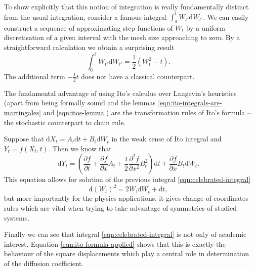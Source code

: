 \documentclass{doctoral}
\newcommand{\pd}{\partial}
\newcommand{\dd}{\mathrm{d}}
\begin{document}
To show explicitly that this notion of integration is really fundamentally distinct from the usual integration, consider a famous integral $\int_0^t W_{t'} \dd W_{t'}$.
We can easily construct a sequence of approximating step functions of $W_{t}$ by a uniform discretisation of a given interval with the mesh size approaching to zero.
By a straightforward calculation we obtain a surprising result
\begin{equation}
    \int_{0}^{t} W_{t'} \dd W_{t'} = \frac{1}{2} \left( W_t^2 - t \right).
    \label{eqn:celebrated-integral}
\end{equation}
The additional term $-\frac{1}{2}t$ does not have a classical counterpart.

The fundamental advantage of using Ito's calculus over Langevin's heuristics (apart from being formally sound and the lemmas \eqref{eqn:ito-integrals-are-martingales} and \eqref{eqn:itos-lemma}) are the transformation rules of Ito's formula -- the stochastic counterpart to chain rule.

Suppose that $\dd X_t = A_t \dd t + B_t \dd W_t$ in the weak sense of Ito integral and $Y_t = f(X_t,t)$.
Then we know that
\begin{equation}
    \dd Y_t = \left( \frac{\pd f}{\pd t} + \frac{\pd f}{\pd x} A_t + \frac{1}{2} \frac{\pd^2 f}{\pd x^2} B_t^2 \right) \dd t + \frac{\pd f}{\pd x} B_t \dd W_t.
    \label{eqn:itos-formula}
\end{equation}
This equation allows for solution of the previous integral \eqref{eqn:celebrated-integral}
\begin{equation}
    \dd (W_t)^2 = 2 W_t \dd W_t + \dd t, \label{eqn:ito-formula-applied}
\end{equation}
but more importantly for the physics applications, it gives change of coordinates rules which are vital when trying to take advantage of symmetries of studied systems.

Finally we can see that integral \eqref{eqn:celebrated-integral} is not only of academic interest.
Equation \eqref{eqn:ito-formula-applied} shows that this is exactly the behaviour of the square displacements which play a central role in determination of the diffusion coefficient.

\end{document}

